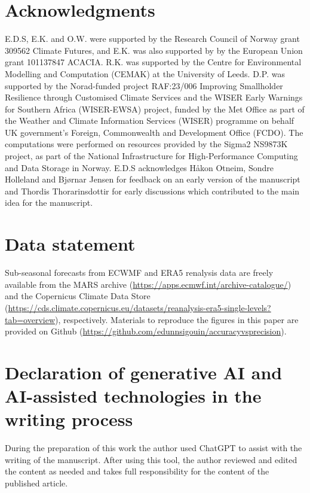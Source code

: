 \documentclass[preprint,12pt,authoryear]{elsarticle}
\begin{document}
\section*{Acknowledgments}
E.D.S, E.K. and O.W. were supported by the Research Council of Norway grant 309562 Climate Futures, and E.K. was also supported by by the European Union grant 101137847 ACACIA. R.K. was supported by the Centre for Environmental Modelling and Computation (CEMAK) at the University of Leeds. D.P. was supported by the Norad-funded project RAF:23/006 Improving Smallholder Resilience through Customised Climate Services and the WISER Early Warnings for Southern Africa (WISER-EWSA) project, funded by the Met Office as part of the Weather and Climate Information Services (WISER) programme on behalf UK government’s Foreign, Commonwealth and Development Office (FCDO). The computations were performed on resources provided by the Sigma2 NS9873K project, as part of the National Infrastructure for High-Performance Computing and Data Storage in Norway. E.D.S acknowledges Håkon Otneim, Sondre Holleland and  Bjørnar Jensen for feedback on an early version of the manuscript and Thordis Thorarinsdottir for early discussions which contributed to the main idea for the manuscript.

\section*{Data statement}
Sub-seasonal forecasts from ECWMF \citep{MARS} and ERA5 renalysis data \citep{Hersbach2020} are freely available from the MARS archive (\url{https://apps.ecmwf.int/archive-catalogue/}) and the Copernicus Climate Data Store (\url{https://cds.climate.copernicus.eu/datasets/reanalysis-era5-single-levels?tab=overview}), respectively. Materials to reproduce the figures in this paper are provided on Github (\url{https://github.com/edunnsigouin/accuracyvsprecision}).

\section*{Declaration of generative AI and AI-assisted technologies in the writing process}
During the preparation of this work the author used ChatGPT to assist with the writing of the manuscript. After using this tool, the author reviewed and edited the content as needed and takes full responsibility for the content of the published article.
\end{document}
